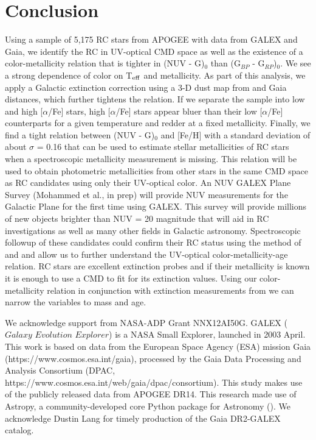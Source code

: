 \documentclass[twocolumn]{emulateapj}
\begin{document}
\section{Conclusion}
Using a sample of 5,175 RC stars from APOGEE with data from GALEX and Gaia, we identify the RC in UV-optical CMD space as well as the existence of a color-metallicity relation that is tighter in (NUV - G)$_0$ than (G$_{BP}$ - G$_{RP}$)$_0$.  We see a strong dependence of color on T$_{\rm{eff}}$ and metallicity. As part of this analysis, we apply a Galactic extinction correction using a 3-D dust map from \citealt{GSF15} and Gaia distances, which further tightens the relation. If we separate the sample into low and high [$\alpha$/Fe] stars, high [$\alpha$/Fe] stars appear bluer than their low [$\alpha$/Fe] counterparts for a given temperature and redder at a fixed metallicity. Finally, we find a tight relation between (NUV - G)$_0$ and [Fe/H] with a standard deviation of about $\sigma$ = 0.16 that can be used to estimate stellar metallicities of RC stars when a spectroscopic metallicity measurement is missing. This relation will be used to obtain photometric metallicities from other stars in the same CMD space as RC candidates using only their UV-optical color. 
An NUV GALEX Plane Survey (Mohammed et al., in prep) will provide NUV measurements for the Galactic Plane for the first time using GALEX. This survey will provide millions of new objects brighter than NUV = 20 magnitude that will aid in RC investigations as well as many other fields in Galactic astronomy. Spectroscopic followup of these candidates could confirm their RC status using the method of \citealt{hawkins18} and \citealt{ting18} and allow us to further understand the UV-optical color-metallicity-age relation. RC stars are excellent extinction probes and if their metallicity is known it is enough to use a CMD to fit for its extinction values. Using our color-metallicity relation in conjunction with extinction measurements from \citealt{GSF15} we can narrow the variables to mass and age. 

\acknowledgments
We acknowledge support from NASA-ADP Grant NNX12AI50G. GALEX ($Galaxy$ $Evolution$ $Explorer$) is a NASA Small Explorer, launched in 2003 April. This work is based on data from the European Space Agency (ESA) mission Gaia (https://www.cosmos.esa.int/gaia), processed by the Gaia Data Processing and Analysis Consortium (DPAC, https://www.cosmos.esa.int/web/gaia/dpac/consortium). This study makes use of the publicly released data from APOGEE DR14. This research made use of Astropy, a community-developed core Python package for Astronomy (\citealt{astropy}). We acknowledge Dustin Lang for timely production of the Gaia DR2-GALEX catalog.



\end{document}
